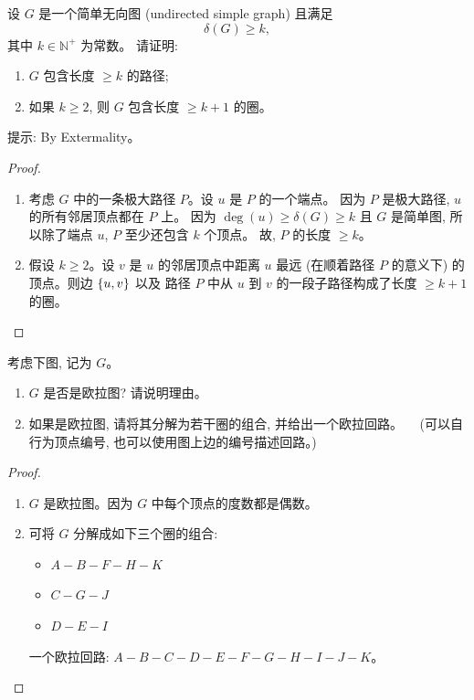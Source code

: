 \documentclass[a4paper, justified]{tufte-handout}
\begin{document}
\begin{problem}
  设 $G$ 是一个简单无向图 (undirected simple graph) 且满足
  \[
    \delta(G) \ge k,
  \]
  其中 $k \in \mathbb{N}^{+}$ 为常数。
  请证明:
  \begin{enumerate}[(1)]
    \item $G$ 包含长度 $\ge k$ 的路径;
    \item 如果 $k \ge 2$, 则 $G$ 包含长度 $\ge k + 1$ 的圈。
  \end{enumerate}
  提示: By Extermality。
\end{problem}

\begin{proof}
  \begin{enumerate}[(1)]
    \item 考虑 $G$ 中的一条极大路径 $P$。设 $u$ 是 $P$ 的一个端点。
      因为 $P$ 是极大路径, $u$ 的所有邻居顶点都在 $P$ 上。
      因为 $\deg(u) \ge \delta(G) \ge k$ 且 $G$ 是简单图,
      所以除了端点 $u$, $P$ 至少还包含 $k$ 个顶点。
      故, $P$ 的长度 $\ge k$。
    \item 假设 $k \ge 2$。设 $v$ 是 $u$ 的邻居顶点中距离 $u$ 最远
      (在顺着路径 $P$ 的意义下) 的顶点。则边 $\{u, v\}$ 以及
      路径 $P$ 中从 $u$ 到 $v$ 的一段子路径构成了长度 $\ge k + 1$ 的圈。
  \end{enumerate}
\end{proof}

\begin{problem}
  考虑下图, 记为 $G$。
  \begin{enumerate}[(1)]
    \item $G$ 是否是欧拉图? 请说明理由。
    \item 如果是欧拉图, 请将其分解为若干圈的组合, 并给出一个欧拉回路。
    　(可以自行为顶点编号, 也可以使用图上边的编号描述回路。)
  \end{enumerate}
\end{problem}

\begin{proof}
  \begin{enumerate}[(1)]
    \item $G$ 是欧拉图。因为 $G$ 中每个顶点的度数都是偶数。
    \item 可将 $G$ 分解成如下三个圈的组合:
      \begin{itemize}
        \item $A-B-F-H-K$
        \item $C-G-J$
        \item $D-E-I$
      \end{itemize}
      一个欧拉回路: $A-B-C-D-E-F-G-H-I-J-K$。
  \end{enumerate}
\end{proof}
\end{document}
